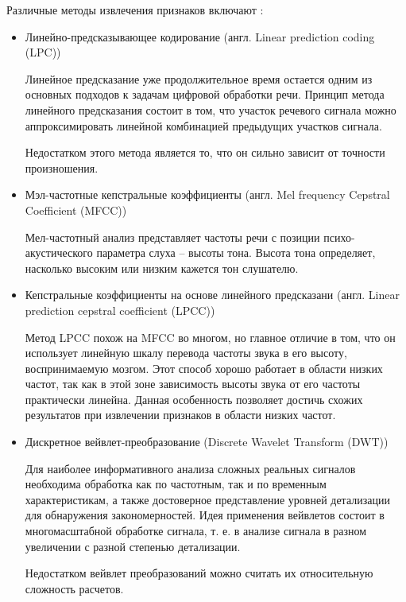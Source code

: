 Различные методы извлечения признаков включают \cite{isvparam1} \cite{isvparam2}:
\begin{itemize}
	\item Линейно-предсказывающее кодирование (англ. Linear prediction coding (LPC))
	
	Линейное предсказание уже продолжительное время остается одним из	основных подходов к задачам цифровой обработки речи. Принцип метода линейного предсказания состоит в том, что участок речевого сигнала можно аппроксимировать линейной комбинацией предыдущих участков сигнала.
	
	Недостатком этого метода является то, что он сильно зависит от точности произношения.
	
	\item Мэл-частотные кепстральные коэффициенты (англ. Mel frequency \newline Cepstral Coefficient (MFCC))
	
	Мел-частотный анализ представляет частоты речи с позиции психо-акустического параметра слуха – высоты тона. Высота тона определяет, насколько высоким или низким кажется тон слушателю. \cite{methodisb} \cite{methodisb2}
	
	\item  Кепстральные коэффициенты на основе линейного предсказани (англ. Linear prediction cepstral coefficient (LPCC))
	
	Метод LPCC похож на MFCC во многом, но главное отличие в том, что он использует линейную шкалу перевода частоты звука в его высоту, воспринимаемую мозгом. Этот способ хорошо работает в области низких частот, так как в этой зоне зависимость высоты звука от его частоты	практически линейна. Данная особенность позволяет достичь схожих	результатов при извлечении признаков в области низких частот. \cite{methodisb} 
	
	\item Дискретное вейвлет-преобразование (Discrete Wavelet Transform (DWT))
	
	Для наиболее информативного анализа сложных реальных сигналов необходима обработка как по частотным, так и по временным характеристикам, а также достоверное представление уровней детализации для обнаружения закономерностей. Идея применения вейвлетов состоит в многомасштабной обработке сигнала, т. е. в анализе сигнала в разном увеличении с разной степенью детализации. \cite{methodisb} \cite{methodisb2}
	
	Недостатком вейвлет преобразований можно считать их относительную сложность расчетов. 
\end{itemize}

